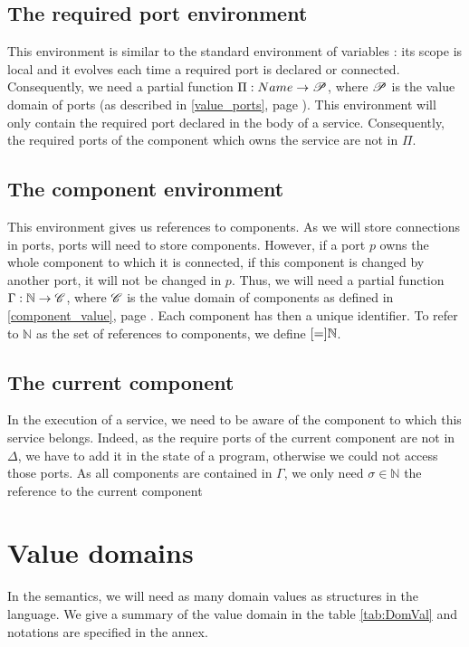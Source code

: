 \subsection{The required port environment}
This environment is similar to the standard environment of variables : its scope is local and it evolves each time a required port is declared or connected. Consequently, we need a partial function $\Pi : Name \rightarrow \mathcal{P}$, where $\mathcal{P}$ is the value domain of ports (as described in \ref{value_ports}, page \pageref{value_ports}). This environment will only contain the required port declared in the body of a service. Consequently, the required ports of the component which owns the service are not in $\Pi$.


\subsection{The component environment}
This environment gives us references to components. As we will store connections in ports, ports will need to store components. However, if a port $p$ owns the whole component to which it is connected, if this component is changed by another port, it will not be changed in $p$. Thus, we will need a partial function $\Gamma : \mathbb{N} \rightarrow \mathcal{C}$, where $\mathcal{C}$ is the value domain of components as defined in \ref{component_value}, page \pageref{component_value}. Each component has then a unique identifier. To refer to $\mathbb{N}$ as the set of references to components, we define $\Cref = \mathbb{N}$.

\subsection{The current component}
In the execution of a service, we need to be aware of the component to which this service belongs. Indeed, as the require ports of the current component are not in $\Delta$, we have to add it in the state of a program, otherwise we could not access those ports. As all components are contained in $\Gamma$, we only need $\sigma \in \mathbb{N}$ the reference to the current component






\section{Value domains}
In the semantics, we will need as many domain values as structures in the language. We give a summary of the value domain in the table  \ref{tab:DomVal} and notations are specified in the annex.

